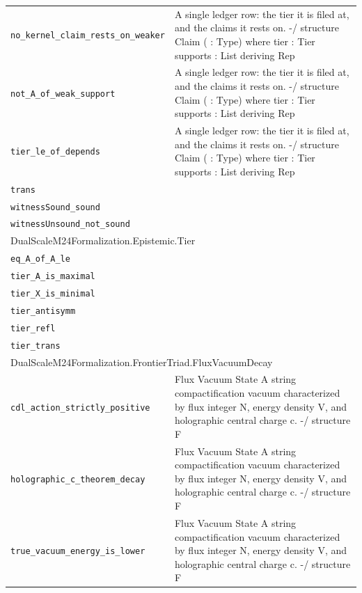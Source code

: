 \begin{longtable}{p{}p{}}
\quad\texttt{\footnotesize no\_kernel\_claim\_rests\_on\_weaker} & {\footnotesize A single ledger row: the tier it is filed at, and the claims it rests on. -/ structure Claim ( : Type) where tier : Tier supports : List  deriving Rep} \\
\quad\texttt{\footnotesize not\_A\_of\_weak\_support} & {\footnotesize A single ledger row: the tier it is filed at, and the claims it rests on. -/ structure Claim ( : Type) where tier : Tier supports : List  deriving Rep} \\
\quad\texttt{\footnotesize tier\_le\_of\_depends} & {\footnotesize A single ledger row: the tier it is filed at, and the claims it rests on. -/ structure Claim ( : Type) where tier : Tier supports : List  deriving Rep} \\
\quad\texttt{\footnotesize trans} & {\footnotesize } \\
\quad\texttt{\footnotesize witnessSound\_sound} & {\footnotesize } \\
\quad\texttt{\footnotesize witnessUnsound\_not\_sound} & {\footnotesize } \\
\multicolumn{2}{l}{\textsf{\small DualScaleM24Formalization.Epistemic.Tier}} \\
\quad\texttt{\footnotesize eq\_A\_of\_A\_le} & {\footnotesize } \\
\quad\texttt{\footnotesize tier\_A\_is\_maximal} & {\footnotesize } \\
\quad\texttt{\footnotesize tier\_X\_is\_minimal} & {\footnotesize } \\
\quad\texttt{\footnotesize tier\_antisymm} & {\footnotesize } \\
\quad\texttt{\footnotesize tier\_refl} & {\footnotesize } \\
\quad\texttt{\footnotesize tier\_trans} & {\footnotesize } \\
\multicolumn{2}{l}{\textsf{\small DualScaleM24Formalization.FrontierTriad.FluxVacuumDecay}} \\
\quad\texttt{\footnotesize cdl\_action\_strictly\_positive} & {\footnotesize Flux Vacuum State A string compactification vacuum characterized by flux integer N, energy density V, and holographic central charge c. -/ structure F} \\
\quad\texttt{\footnotesize holographic\_c\_theorem\_decay} & {\footnotesize Flux Vacuum State A string compactification vacuum characterized by flux integer N, energy density V, and holographic central charge c. -/ structure F} \\
\quad\texttt{\footnotesize true\_vacuum\_energy\_is\_lower} & {\footnotesize Flux Vacuum State A string compactification vacuum characterized by flux integer N, energy density V, and holographic central charge c. -/ structure F} \\

\end{longtable}

